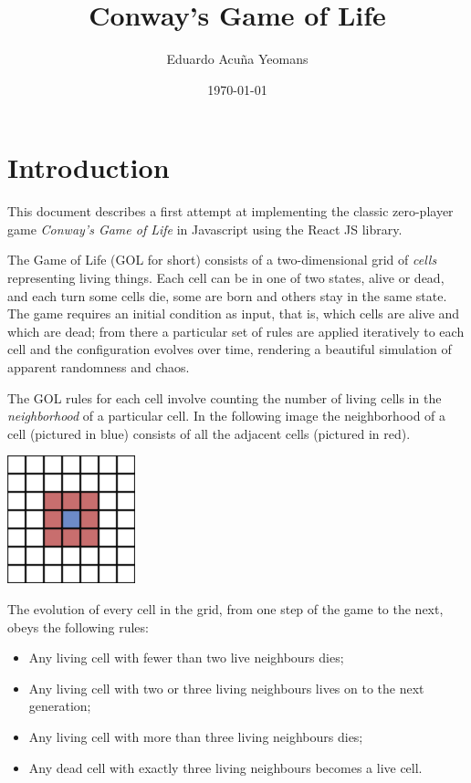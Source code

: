\documentclass[11pt]{article}
\author{Eduardo Acuña Yeomans}
\date{\today}
\title{Conway's Game of Life}
\begin{document}
\maketitle

\section{Introduction}
\label{sec:orgc83512f}

This document describes a first attempt at implementing the classic zero-player game \emph{Conway's Game of Life} in Javascript using the React JS library.

The Game of Life (GOL for short) consists of a two-dimensional grid of \emph{cells} representing living things. Each cell can be in one of two states, alive or dead, and each turn some cells die, some are born and others stay in the same state. The game requires an initial condition as input, that is, which cells are alive and which are dead; from there a particular set of rules are applied iteratively to each cell and the configuration evolves over time, rendering a beautiful simulation of apparent randomness and chaos.

The GOL rules for each cell involve counting the number of living cells in the \emph{neighborhood} of a particular cell. In the following image the neighborhood of a cell (pictured in blue) consists of all the adjacent cells (pictured in red).

\begin{center}
\includegraphics[width=10em]{./img/neighbors.png}
\label{orgf6017cc}
\end{center}

The evolution of every cell in the grid, from one step of the game to the next, obeys the following rules:
\begin{itemize}
\item Any living cell with fewer than two live neighbours dies;
\item Any living cell with two or three living neighbours lives on to the next generation;
\item Any living cell with more than three living neighbours dies;
\item Any dead cell with exactly three living neighbours becomes a live cell.
\end{itemize}
\end{document}
